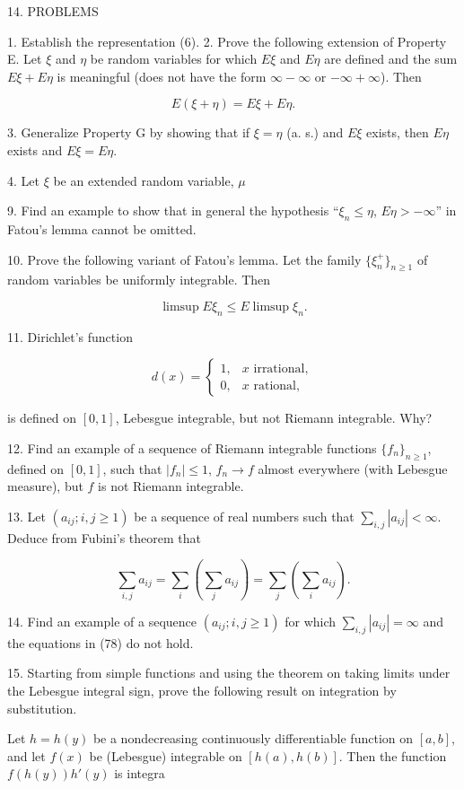 14. PROBLEMS

1. Establish the representation (6).
2. Prove the following extension of Property E. Let $\xi$ and $\eta$ be random variables for which $E\xi$ and $E\eta$ are defined and the sum $E\xi + E\eta$ is meaningful (does not have the form $\infty - \infty$ or $-\infty + \infty$). Then

$$E(\xi + \eta) = E\xi + E\eta.$$

3. Generalize Property G by showing that if $\xi = \eta$ (a. s.) and $E\xi$ exists, then $E\eta$ exists and $E\xi = E\eta$.

4. Let $\xi$ be an extended random variable, $\mu$

9. Find an example to show that in general the hypothesis “$\xi_n \leq \eta$, $E \eta > -\infty$” in Fatou’s lemma cannot be omitted.

10. Prove the following variant of Fatou’s lemma. Let the family $\{\xi_n^+\}_{n \geq 1}$ of random variables be uniformly integrable. Then

$$\limsup E \xi_n \leq E \limsup \xi_n.$$

11. Dirichlet’s function

$$d(x) = \begin{cases} 1, & x \text{ irrational}, \\ 0, & x \text{ rational}, \end{cases}$$

is defined on $[0, 1]$, Lebesgue integrable, but not Riemann integrable. Why?

12. Find an example of a sequence of Riemann integrable functions $\{f_n\}_{n \geq 1}$, defined on $[0, 1]$, such that $|f_n| \leq 1$, $f_n \rightarrow f$ almost everywhere (with Lebesgue measure), but $f$ is not Riemann integrable.

13. Let $(a_{ij}; i,j \geq 1)$ be a sequence of real numbers such that $\sum_{i,j} |a_{ij}| < \infty$. Deduce from Fubini’s theorem that

$$\sum_{i,j} a_{ij} = \sum_i \left( \sum_j a_{ij} \right) = \sum_j \left( \sum_i a_{ij} \right).$$

14. Find an example of a sequence $(a_{ij}; i,j \geq 1)$ for which $\sum_{i,j} |a_{ij}| = \infty$ and the equations in (78) do not hold.

15. Starting from simple functions and using the theorem on taking limits under the Lebesgue integral sign, prove the following result on integration by substitution.

Let $h = h(y)$ be a nondecreasing continuously differentiable function on $[a, b]$, and let $f(x)$ be (Lebesgue) integrable on $[h(a), h(b)]$. Then the function $f(h(y))h'(y)$ is integra


